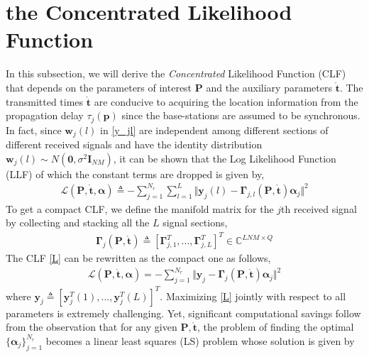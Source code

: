 \documentclass[review]{elsarticle}
\begin{document}
\section{the Concentrated Likelihood Function}
In this subsection, we will derive the \emph{Concentrated} Likelihood Function (CLF) that depends on the parameters of interest $\boldsymbol{P}$ and the auxiliary parameters $\mathring{\boldsymbol{t}}$. The transmitted times $\mathring{\boldsymbol{t}}$ are conducive to acquiring the location information from the propagation delay $\tau_j(\boldsymbol{p})$ since the base-stations are assumed to be synchronous. In fact, since $\boldsymbol{w}_j(l)$ in \eqref{y_jl} are independent among different sections of different received signals and have the identity distribution $\boldsymbol{w}_j(l)\sim N(\boldsymbol{0},\sigma^2\boldsymbol{I}_{NM})$, it can be shown that the Log Likelihood Function (LLF) of which the constant terms are dropped is given by,
\begin{align}
\mathcal{L}(\boldsymbol{P},\mathring{\boldsymbol{t}},\boldsymbol{\alpha})\triangleq-\sum_{j=1}^{N_r}\sum_{l=1}^L\Vert \boldsymbol{y}_j(l)-\boldsymbol{\Gamma}_{j,l}(\boldsymbol{P},\mathring{\boldsymbol{t}})\boldsymbol{\alpha}_j\Vert^2
\end{align}
To get a compact CLF, we define the manifold matrix for the $j$th received signal by collecting and stacking all the $L$ signal sections,
\begin{align}\label{Gammaj}
    \boldsymbol{\Gamma}_{j}(\boldsymbol{P},\mathring{\boldsymbol{t}})\triangleq[\boldsymbol{\Gamma}_{j,1}^T,...,\boldsymbol{\Gamma}_{j,L}^T]^T\in \mathbb{C}^{LNM\times Q}
\end{align}
The CLF \eqref{L} can be rewritten as the compact one as follows,
\begin{align}\label{L}
    \mathcal{L}(\boldsymbol{P},\mathring{\boldsymbol{t}},\boldsymbol{\alpha})=-\sum_{j=1}^{N_r}\Vert \boldsymbol{y}_j-\boldsymbol{\Gamma}_{j}(\boldsymbol{P},\mathring{\boldsymbol{t}})\boldsymbol{\alpha}_j\Vert^2
\end{align}
where $\boldsymbol{y}_j\triangleq[\boldsymbol{y}_j^T(1),...,\boldsymbol{y}_j^T(L)]^T$. Maximizing \eqref{L} jointly with respect to all parameters is extremely challenging. Yet, significant computational savings follow from the observation that for any given $\boldsymbol{P},\mathring{\boldsymbol{t}}$, the problem of finding the optimal $\lbrace \boldsymbol{\alpha}_j\rbrace _{j=1}^{N_r}$ becomes a linear least squares (LS) problem \cite{Golub1973The} whose solution is given by
\end{document}
